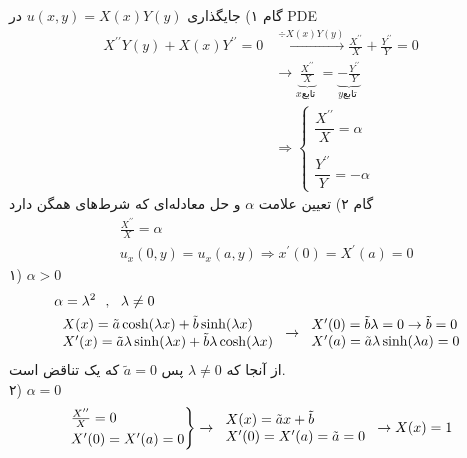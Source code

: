 گام ۱) جایگذاری
$u(x,y)=X(x)Y(y)$
در PDE
\[\begin{aligned}
	X^{\prime\prime}Y(y)+X(x)Y^{\prime\prime}=0
	&\xrightarrow{\div X(x)Y(y)}
	\frac{X^{\prime\prime}}{X}+\frac{Y^{\prime\prime}}{Y}=0
	\\ & \rightarrow \underbrace{\frac{X^{\prime\prime}}{X}}_{x \text{تابع }}=
	\underbrace{-\frac{Y^{\prime\prime}}{Y}}_{y \text{تابع }}
	\\ &
	\Longrightarrow \begin{cases}
		\dfrac{X^{\prime\prime}}{X}=\alpha
		\\
		\\
		\dfrac{Y^{\prime\prime}}{Y}=-\alpha
	\end{cases}
\end{aligned}\]
گام ۲) تعیین علامت
$\alpha$
و حل معادله‌ای که شرط‌های همگن دارد
\[\begin{aligned}
	&
	\frac{X^{\prime\prime}}{X}=\alpha
	\\ &
	u_x(0,y)=u_x(a,y)\Rightarrow x^\prime(0)=X^\prime(a)=0
\end{aligned}\]
۱)
$\alpha>0$
\[\begin{aligned}
	& \alpha=\lambda^2 \ \ , \ \ \lambda\ne0
	\\ &
	\begin{tabular}{l}
		$X(x)=\tilde{a}\cosh(\lambda x)+\tilde{b}\sinh(\lambda x)$
		\\
		$X^\prime(x)=\tilde{a}\lambda\sinh(\lambda x)+\tilde{b}\lambda\cosh(\lambda x)$
	\end{tabular}\rightarrow
	\begin{tabular}{l}
		$X^\prime(0)=\tilde{b}\lambda=0\rightarrow\tilde{b}=0$
		\\
		$X^\prime(a)=\tilde{a}\lambda\sinh(\lambda a)=0$
	\end{tabular}
\end{aligned}\]
از آنجا که $\lambda\ne0$ پس
$\tilde{a}=0$
که یک تناقض است.\\
۲)
$\alpha=0$
\[\begin{aligned}
	\begin{rcases}
		\frac{X^{\prime\prime}}{X}=0\\
		X^\prime(0)=X^\prime(a)=0
	\end{rcases}\rightarrow
	\begin{tabular}{l}
		$X(x)=\tilde{a}x+\tilde{b}$\\
		$X^\prime(0)=X^\prime(a)=\tilde{a}=0$
	\end{tabular}\rightarrow X(x)=1
\end{aligned}\]

